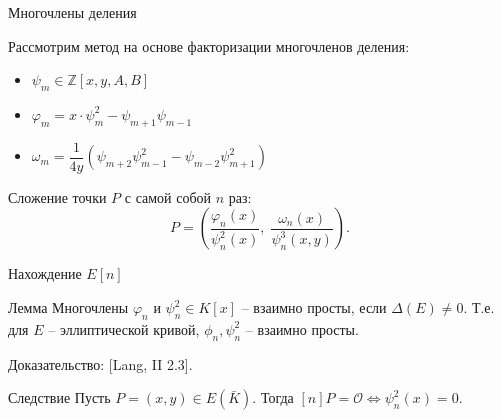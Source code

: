 \documentclass{beamer}
\begin{document}
\begin{frame}{Многочлены деления}
    \vspace{1em}
    
    Рассмотрим метод на основе факторизации многочленов деления:
    
    \begin{itemize}
        \item $\psi_m \in \mathbb{Z}\left[x,y,A,B\right]$
        \item $\varphi_m = x \cdot \psi_m^2 - \psi_{m + 1} \psi_{m - 1}$
        
        \item $\omega_m = \dfrac{1}{{4y}}\left( {{\psi_{m + 2}}\psi_{m - 1}^2 - {\psi_{m - 2}}\psi_{m + 1}^2} \right)$
    \end{itemize}
    Сложение точки $P$ с самой собой $n$ раз:
    \begin{equation*}
        [n] P = \left( {\frac{{{\varphi _n}(x)}}{{\psi _n^2(x)}},\;\frac{{{\omega _n}( x )}}{{\psi _n^3(x,y)}}} \right).
    \end{equation*}
\end{frame}

\begin{frame}{Нахождение $E[n]$}
\begin{block}{Лемма}
Многочлены ${\varphi _n}$ и $\psi _n^2 \in K\left[ x \right]$ -- взаимно просты, если $\Delta (E) \ne 0$. Т.е. для $E$ -- эллиптической кривой, ${\phi _n}, \psi _n^2$ -- взаимно просты.
\end{block}
\structure{$\triangleleft$} Доказательство: [Lang, II 2.3].\structure{$\triangleright$}

\vspace{1em}

\begin{block}{Следствие}
	Пусть $P = (x,y) \in E(\bar{K})$. Тогда $[n] P = \mathcal{O} \Leftrightarrow \psi_n^2(x) = 0$.
\end{block}
\end{frame}
\end{document}
